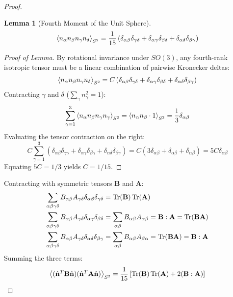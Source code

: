 \documentclass[11pt,a4paper]{article}
\theoremstyle{definition}
\newtheorem{lemma}{Lemma}
\begin{document}
\begin{proof}
\begin{lemma}[Fourth Moment of the Unit Sphere]
\begin{equation}
\ev{n_\alpha n_\beta n_\gamma n_\delta}_{S^2} = \frac{1}{15} \left( \delta_{\alpha\beta}\delta_{\gamma\delta} + \delta_{\alpha\gamma}\delta_{\beta\delta} + \delta_{\alpha\delta}\delta_{\beta\gamma} \right)
\end{equation}
\end{lemma}
\begin{proof}[Proof of Lemma]
By rotational invariance under $SO(3)$, any fourth-rank isotropic tensor must be a linear combination of pairwise Kronecker deltas:
\begin{equation}
\ev{n_\alpha n_\beta n_\gamma n_\delta}_{S^2} = C \left( \delta_{\alpha\beta}\delta_{\gamma\delta} + \delta_{\alpha\gamma}\delta_{\beta\delta} + \delta_{\alpha\delta}\delta_{\beta\gamma} \right)
\end{equation}
Contracting $\gamma$ and $\delta$ ($\sum_\gamma n_\gamma^2 = 1$):
\begin{equation}
\sum_{\gamma=1}^3 \ev{n_\alpha n_\beta n_\gamma n_\gamma}_{S^2} = \ev{n_\alpha n_\beta \cdot 1}_{S^2} = \frac{1}{3}\delta_{\alpha\beta}
\end{equation}
Evaluating the tensor contraction on the right:
\begin{equation}
C \sum_{\gamma=1}^3 \left( \delta_{\alpha\beta}\delta_{\gamma\gamma} + \delta_{\alpha\gamma}\delta_{\beta\gamma} + \delta_{\alpha\delta}\delta_{\beta\gamma} \right) = C (3\delta_{\alpha\beta} + \delta_{\alpha\beta} + \delta_{\alpha\beta}) = 5C \delta_{\alpha\beta}
\end{equation}
Equating $5C = 1/3$ yields $C = 1/15$.
\end{proof}

Contracting with symmetric tensors $\mathbf{B}$ and $\mathbf{A}$:
\begin{align}
\sum_{\alpha\beta\gamma\delta} B_{\alpha\beta} A_{\gamma\delta} \delta_{\alpha\beta}\delta_{\gamma\delta} &= \Tr(\mathbf{B})\Tr(\mathbf{A}) \\
\sum_{\alpha\beta\gamma\delta} B_{\alpha\beta} A_{\gamma\delta} \delta_{\alpha\gamma}\delta_{\beta\delta} &= \sum_{\alpha\beta} B_{\alpha\beta} A_{\alpha\beta} = \mathbf{B}:\mathbf{A} = \Tr(\mathbf{B}\mathbf{A}) \\
\sum_{\alpha\beta\gamma\delta} B_{\alpha\beta} A_{\gamma\delta} \delta_{\alpha\delta}\delta_{\beta\gamma} &= \sum_{\alpha\beta} B_{\alpha\beta} A_{\beta\alpha} = \Tr(\mathbf{B}\mathbf{A}) = \mathbf{B}:\mathbf{A}
\end{align}
Summing the three terms:
\begin{equation}
\ev{(\hat{\mathbf{n}}^T \mathbf{B} \hat{\mathbf{n}})(\hat{\mathbf{n}}^T \mathbf{A} \hat{\mathbf{n}})}_{S^2} = \frac{1}{15} \left[ \Tr(\mathbf{B})\Tr(\mathbf{A}) + 2 (\mathbf{B}:\mathbf{A}) \right]
\end{equation}


\end{proof}
\end{document}
